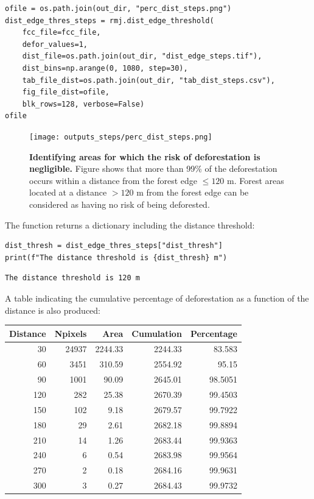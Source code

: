 \documentclass[paper=a4, 12pt, DIV=12]{scrartcl}
\begin{document}
\begin{verbatim}
ofile = os.path.join(out_dir, "perc_dist_steps.png")
dist_edge_thres_steps = rmj.dist_edge_threshold(
    fcc_file=fcc_file,
    defor_values=1,
    dist_file=os.path.join(out_dir, "dist_edge_steps.tif"),
    dist_bins=np.arange(0, 1080, step=30),
    tab_file_dist=os.path.join(out_dir, "tab_dist_steps.csv"),
    fig_file_dist=ofile,
    blk_rows=128, verbose=False)
ofile
\end{verbatim}

\begin{figure}[H]
\centering
\texttt{[image: outputs\_steps/perc\_dist\_steps.png]}
\caption{\label{fig:org244c669}\textbf{Identifying areas for which the risk of deforestation is negligible.} Figure shows that more than 99\% of the deforestation occurs within a distance from the forest edge \(\leq 120\) m. Forest areas located at a distance \(> 120\) m from the forest edge can be considered as having no risk of being deforested.}
\end{figure}

The function returns a dictionary including the distance threshold:

\begin{verbatim}
dist_thresh = dist_edge_thres_steps["dist_thresh"]
print(f"The distance threshold is {dist_thresh} m")
\end{verbatim}

\begin{verbatim}
The distance threshold is 120 m
\end{verbatim}


A table indicating the cumulative percentage of deforestation as a function of the distance is also produced:

\begin{center}
\begin{tabular}{rrrrr}
Distance & Npixels & Area & Cumulation & Percentage\\
\hline
30 & 24937 & 2244.33 & 2244.33 & 83.583\\
60 & 3451 & 310.59 & 2554.92 & 95.15\\
90 & 1001 & 90.09 & 2645.01 & 98.5051\\
120 & 282 & 25.38 & 2670.39 & 99.4503\\
150 & 102 & 9.18 & 2679.57 & 99.7922\\
180 & 29 & 2.61 & 2682.18 & 99.8894\\
210 & 14 & 1.26 & 2683.44 & 99.9363\\
240 & 6 & 0.54 & 2683.98 & 99.9564\\
270 & 2 & 0.18 & 2684.16 & 99.9631\\
300 & 3 & 0.27 & 2684.43 & 99.9732\\
\end{tabular}
\end{center}
\end{document}
